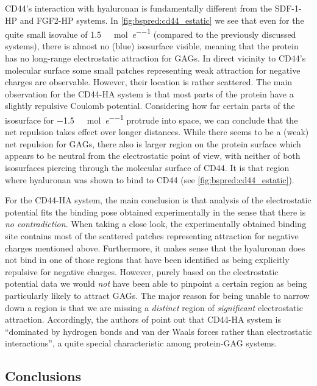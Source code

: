 CD44's interaction with hyaluronan is fundamentally different from the SDF-1-HP
and FGF2-HP systems. In \cref{fig:bspred:cd44_estatic} we see that even for the
quite small isovalue of \SI{1.5}{\kilo\calory\per\mole\per\elementarycharge}
(compared to the previously discussed systems), there is almost no (blue)
isosurface visible, meaning that the protein has no long-range electrostatic
attraction for GAGs. In direct vicinity to CD44's molecular surface some small
patches representing weak attraction for negative charges are observable.
However, their location is rather scattered. The main observation for the
CD44-HA system is that most parts of the protein have a slightly repulsive
Coulomb potential. Considering how far certain parts of the isosurface for
\SI{-1.5}{\kilo\calory\per\mole\per\elementarycharge} protrude into space, we
can conclude that the net repulsion takes effect over longer distances. While
there seems to be a (weak) net repulsion for GAGs, there also is larger region
on the protein surface which appears to be neutral from the electrostatic point
of view, with neither of both isosurfaces piercing through the molecular surface
of CD44. It is that region where hyaluronan was shown to bind to CD44 (see
\cref{fig:bspred:cd44_estatic}).

For the CD44-HA system, the main conclusion is that analysis of the
electrostatic potential fits the binding pose obtained experimentally in the
sense that there is \textit{no contradiction}. When taking a close look, the
experimentally obtained binding site contains most of the scattered patches
representing attraction for negative charges mentioned above. Furthermore, it
makes sense that the hyaluronan does not bind in one of those regions that have
been identified as being explicitly repulsive for negative charges. However,
purely based on the electrostatic potential data we would \textit{not} have been
able to pinpoint a certain region as being particularly likely to attract GAGs.
The major reason for being unable to narrow down a region is that we are missing
a \textit{distinct} region of \textit{significant} electrostatic attraction.
Accordingly, the authors of \cite{cd44_hya_2007} point out that CD44-HA system
is  \enquote{dominated by hydrogen bonds and van der Waals forces rather than
electrostatic interactions}, a quite special characteristic among protein-GAG
systems.



\subsection{Conclusions}
\label{bspred:general_conclusions}

